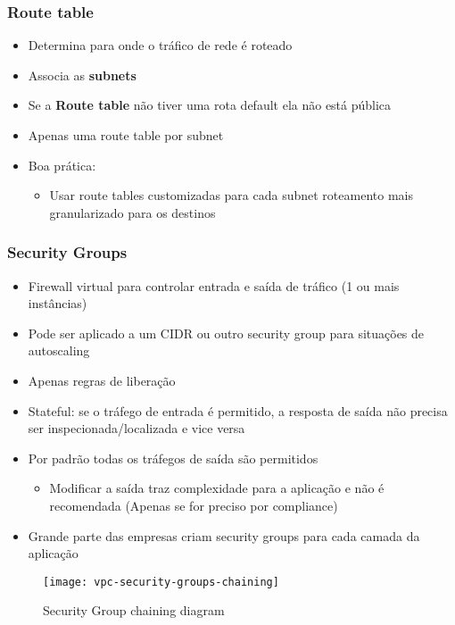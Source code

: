 \begin{frame} \frametitle{Route table}
	\begin{itemize}
		\item Determina para onde o tráfico de rede é roteado
		\item Associa as \textbf{subnets}
		\item Se a \textbf{Route table} não tiver uma rota default ela não está pública
		\item Apenas uma route table por subnet
		\item Boa prática:
			\begin{itemize}
				\item Usar route tables customizadas para cada subnet roteamento mais granularizado para os destinos
			\end{itemize}
	\end{itemize}
\end{frame}

\begin{frame}[allowframebreaks]
	\frametitle{Security Groups}
	\begin{itemize}
		\item Firewall virtual para controlar entrada e saída de tráfico (1 ou mais instâncias)
		\item Pode ser aplicado a um CIDR ou outro security group para situações de autoscaling
		\item Apenas regras de liberação
		\item Stateful: se o tráfego de entrada é permitido, a resposta de saída não precisa ser inspecionada/localizada e vice versa
		\item Por padrão todas os tráfegos de saída são permitidos
			\begin{itemize}
				\item Modificar a saída traz complexidade para a aplicação e não é recomendada (Apenas se for preciso por compliance)
			\end{itemize}
		\framebreak
		\item Grande parte das empresas criam security groups para cada camada da aplicação

	\end{itemize}
	\begin{figure}[htpb]
		\centering
			\texttt{[image: vpc-security-groups-chaining]}
		\caption{Security Group chaining diagram}
	\end{figure}
\end{frame}

